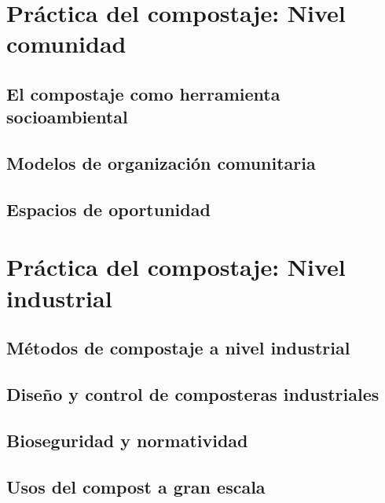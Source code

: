 \documentclass{ManualBiotecnologico}
\begin{document}
\part{Práctica del compostaje: Nivel comunidad}

    \chapter{El compostaje como herramienta socioambiental}
    \chapter{Modelos de organización comunitaria}
    \chapter{Espacios de oportunidad}

\part{Práctica del compostaje: Nivel industrial}

    \chapter{Métodos de compostaje a nivel industrial}
    \chapter{Diseño y control de composteras industriales}
    \chapter{Bioseguridad y normatividad}
    \chapter{Usos del compost a gran escala}
    
    
    \PlainGeom
    \appendix
    
    
    \backmatter

\Bibliografia
\Glosarios
    
\end{document}
